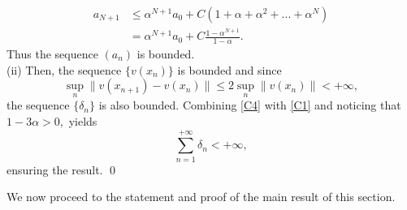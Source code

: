 \documentclass[11pt]{article}
\makeatletter
\renewenvironment{proof}[1][\proofname]{\par
	\normalfont
	\topsep0\p@\@plus3\p@ \trivlist
	\item[\hskip\labelsep\itshape
	#1\@addpunct{.}]\ignorespaces
}{%
	\qed\endtrivlist
}
\theoremstyle{definition}
\theoremstyle{definition}
\theoremstyle{definition}
\makeatother
\begin{document}
\begin{proof}
\begin{align*}
	a_{N+1}&\leq \alpha^{N+1}a_{0}+C(1+\alpha+\alpha^2+...+\alpha^{N})
	\\
	&=\alpha^{N+1}a_{0}+C\frac{1-\alpha^{N+1}}{1-\alpha}.
	\end{align*}
	{Thus the sequence $(a_n)$ is bounded}.\\
	(ii) Then, the sequence $\{v(x_n)\}$ is bounded and since 
	\begin{equation}\label{C4}
	\sup_n\|v(x_{n+1})-v(x_n)\|\leq 2\sup_n\|v(x_n)\| <+\infty,
	\end{equation} 
	the sequence $\{\delta_n\}$ is also bounded.
	Combining \eqref{C4}  with \eqref{C1} and noticing that $1-3\alpha>0,$ yields  
	$$\sum_{n=1}^{+\infty}\delta_n<+\infty,$$
	ensuring the result. 
\end{proof}  

We now proceed to the statement and proof of the main result of this section.  
\end{document}
